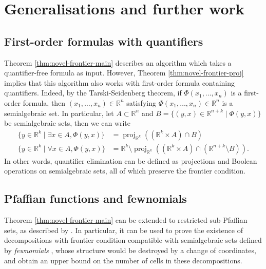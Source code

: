 \documentclass[
]{book}
\theoremstyle{definition}
\theoremstyle{definition}
\theoremstyle{definition}
\theoremstyle{definition}
\theoremstyle{remark}
\begin{document}
\hypertarget{generalisations-and-further-work}{%
\section{Generalisations and further work}\label{generalisations-and-further-work}}

\hypertarget{first-order-formulas-with-quantifiers}{%
\subsection{First-order formulas with quantifiers}\label{first-order-formulas-with-quantifiers}}

Theorem \ref{thm:novel-frontier-main} describes an algorithm which takes a quantifier-free formula as input. However, Theorem \ref{thm:novel-frontier-proj} implies that this algorithm also works with first-order formula containing quantifiers. Indeed, by the Tarski-Seidenberg theorem, if \(\Phi(x_1,\ldots,x_n)\) is a first-order formula, then \((x_1,\ldots,x_n) \in \mathbb{R}^n\) satisfying \(\Phi(x_1,\ldots,x_n) \in \mathbb{R}^n\) is a semialgebraic set. In particular, let \(A \subset \mathbb{R}^n\) and \(B = \{ (y,x) \in \mathbb{R}^{n+k} \mid \Phi(y,x) \}\) be semialgebraic sets, then we can write
\begin{align*}
\{ y \in \mathbb{R}^k \mid \exists x \in A, \Phi(y,x) \} &= {\operatorname{proj}_{\mathbb{R}^{k}}}((\mathbb{R}^k \times A) \cap B)\\
\{ y \in \mathbb{R}^k \mid \forall x \in A, \Phi(y,x) \} &= \mathbb{R}^k \setminus {\operatorname{proj}_{\mathbb{R}^{k}}}((\mathbb{R}^k \times A) \cap (\mathbb{R}^{n+k} \setminus B)).
\end{align*}
In other words, quantifier elimination can be defined as projections and Boolean operations on semialgebraic sets, all of which preserve the frontier condition.

\hypertarget{pfaffian-functions-and-fewnomials}{%
\subsection{Pfaffian functions and fewnomials}\label{pfaffian-functions-and-fewnomials}}

Theorem \ref{thm:novel-frontier-main} can be extended to restricted sub-Pfaffian sets, as described by \citet{gv04}.
In particular, it can be used to prove the existence of decompositions with frontier condition compatible with semialgebraic sets defined by \emph{fewnomials} \citep[Section 2.6]{gv04}, whose structure would be destroyed by a change of coordinates, and obtain an upper bound on the number of cells in these decompositions.
\end{document}
